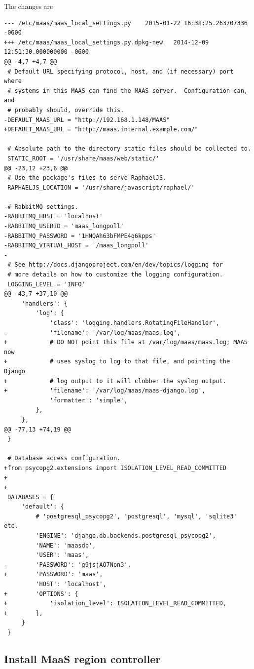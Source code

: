 The changes are
\begin{verbatim}
--- /etc/maas/maas_local_settings.py    2015-01-22 16:38:25.263707336 -0600
+++ /etc/maas/maas_local_settings.py.dpkg-new   2014-12-09 12:51:30.000000000 -0600
@@ -4,7 +4,7 @@
 # Default URL specifying protocol, host, and (if necessary) port where
 # systems in this MAAS can find the MAAS server.  Configuration can, and
 # probably should, override this.
-DEFAULT_MAAS_URL = "http://192.168.1.148/MAAS"
+DEFAULT_MAAS_URL = "http://maas.internal.example.com/"

 # Absolute path to the directory static files should be collected to.
 STATIC_ROOT = '/usr/share/maas/web/static/'
@@ -23,12 +23,6 @@
 # Use the package's files to serve RaphaelJS.
 RAPHAELJS_LOCATION = '/usr/share/javascript/raphael/'

-# RabbitMQ settings.
-RABBITMQ_HOST = 'localhost'
-RABBITMQ_USERID = 'maas_longpoll'
-RABBITMQ_PASSWORD = '1HNQAh63bFMPE4q6kpps'
-RABBITMQ_VIRTUAL_HOST = '/maas_longpoll'
-
 # See http://docs.djangoproject.com/en/dev/topics/logging for
 # more details on how to customize the logging configuration.
 LOGGING_LEVEL = 'INFO'
@@ -43,7 +37,10 @@
     'handlers': {
         'log': {
             'class': 'logging.handlers.RotatingFileHandler',
-            'filename': '/var/log/maas/maas.log',
+            # DO NOT point this file at /var/log/maas/maas.log; MAAS now
+            # uses syslog to log to that file, and pointing the Django
+            # log output to it will clobber the syslog output.
+            'filename': '/var/log/maas/maas-django.log',
             'formatter': 'simple',
         },
     },
@@ -77,13 +74,19 @@
 }

 # Database access configuration.
+from psycopg2.extensions import ISOLATION_LEVEL_READ_COMMITTED
+
+
 DATABASES = {
     'default': {
         # 'postgresql_psycopg2', 'postgresql', 'mysql', 'sqlite3' etc.
         'ENGINE': 'django.db.backends.postgresql_psycopg2',
         'NAME': 'maasdb',
         'USER': 'maas',
-        'PASSWORD': 'g9jsjAO7Non3',
+        'PASSWORD': 'maas',
         'HOST': 'localhost',
+        'OPTIONS': {
+            'isolation_level': ISOLATION_LEVEL_READ_COMMITTED,
+        },
     }
 }
\end{verbatim}


\subsection{Install MaaS region controller}
\label{sec:install_MaaS_region-controller}

